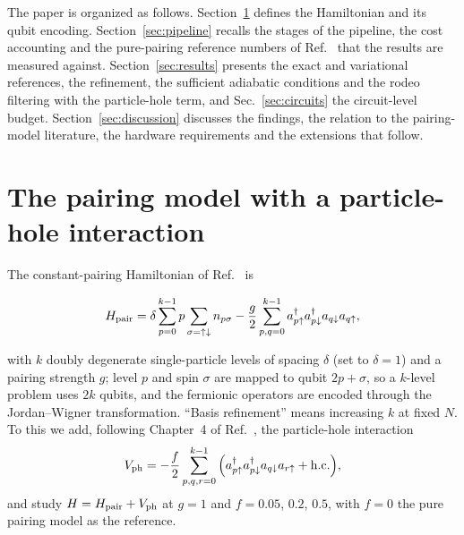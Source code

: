 \documentclass[
  aps,            %
  prc,            %
  reprint,        %
  superscriptaddress,
  floatfix,
  nofootinbib
]{revtex4-2}
\newcommand{\Vph}{V_{\mathrm{ph}}}
\begin{document}
The paper is organized as follows.  Section~\ref{sec:model} defines the
Hamiltonian and its qubit encoding.  Section~\ref{sec:pipeline} recalls the
stages of the pipeline, the cost accounting and the pure-pairing reference
numbers of Ref.~\cite{PairingCompanion} that the results are measured
against.  Section~\ref{sec:results} presents the exact and variational
references, the refinement, the sufficient adiabatic conditions and the
rodeo filtering with the particle-hole term, and Sec.~\ref{sec:circuits}
the circuit-level budget.  Section~\ref{sec:discussion} discusses the
findings, the relation to the pairing-model literature, the hardware
requirements and the extensions that follow.

\section{The pairing model with a particle-hole interaction}
\label{sec:model}
The constant-pairing Hamiltonian of Ref.~\cite{PairingCompanion} is
\begin{widetext}
\begin{equation}
  H_{\rm pair}=\delta\sum_{p=0}^{k-1} p\sum_{\sigma=\uparrow\downarrow} n_{p\sigma}
   -\frac{g}{2}\sum_{p,q=0}^{k-1} a^\dagger_{p\uparrow}a^\dagger_{p\downarrow}
     a_{q\downarrow}a_{q\uparrow},
  \label{eq:H}
\end{equation}
\end{widetext}
with $k$ doubly degenerate single-particle levels of spacing $\delta$ (set to
$\delta=1$) and a pairing strength $g$; level $p$ and spin $\sigma$ are mapped
to qubit $2p+\sigma$, so a $k$-level problem uses $2k$ qubits, and the
fermionic operators are encoded through the Jordan--Wigner transformation.
``Basis refinement'' means increasing $k$ at fixed $N$.  To this we add,
following Chapter~4 of Ref.~\cite{MHJbook}, the particle-hole interaction
\begin{equation}
  \Vph=-\frac{f}{2}\sum_{p,q,r=0}^{k-1}\Big(
    a^\dagger_{p\uparrow}a^\dagger_{p\downarrow}a_{q\downarrow}a_{r\uparrow}
    +{\rm h.c.}\Big),
  \label{eq:Vph}
\end{equation}
and study $H=H_{\rm pair}+\Vph$ at $g=1$ and $f=0.05$, $0.2$, $0.5$, with
$f=0$ the pure pairing model as the reference.
\end{document}
